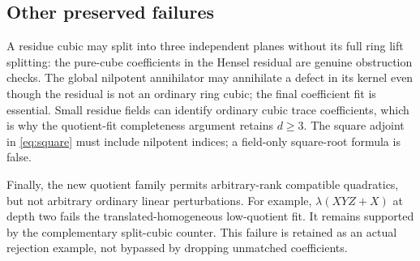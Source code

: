 \subsection{Other preserved failures}
A residue cubic may split into three independent planes without its full
ring lift splitting: the pure-cube coefficients in the Hensel residual
are genuine obstruction checks. The global nilpotent annihilator may
annihilate a defect in its kernel even though the residual is not an
ordinary ring cubic; the final coefficient fit is essential.
Small residue fields can identify ordinary cubic trace coefficients,
which is why the quotient-fit completeness argument retains $d\ge3$.
The square adjoint in \eqref{eq:square} must include nilpotent indices;
a field-only square-root formula is false.

Finally, the new quotient family permits arbitrary-rank compatible
quadratics, but not arbitrary ordinary linear perturbations. For example,
$\lambda(XYZ+X)$ at depth two fails the translated-homogeneous low-quotient
fit. It remains supported by the complementary split-cubic counter.
This failure is retained as an actual rejection example, not bypassed
by dropping unmatched coefficients.
